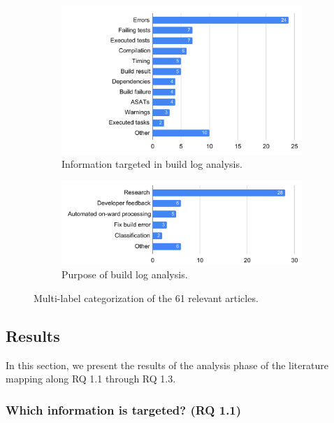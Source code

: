 \begin{figure}
\centering
\begin{subfigure}[t]{\columnwidth}
		\centering
		\includegraphics[width=\columnwidth,
		clip]{img/lit-sur/info_target.pdf}
		\caption{Information targeted in build log analysis.}
		\label{fig:litsur:info_target}

\end{subfigure}\hspace{\fill}
\begin{subfigure}[t]{\columnwidth}
		\centering
				\includegraphics[width=\columnwidth,
				clip]{img/lit-sur/use.pdf}
		\caption{Purpose of build log analysis.}
		\label{fig:litsur:use}

\end{subfigure}

\caption{Multi-label categorization of the 61 relevant articles.}
\end{figure}

\subsection{Results}
In this section, we present the results of the analysis phase of the
literature mapping along RQ 1.1 through RQ 1.3.

\subsubsection{Which information is targeted? (RQ 1.1)}

